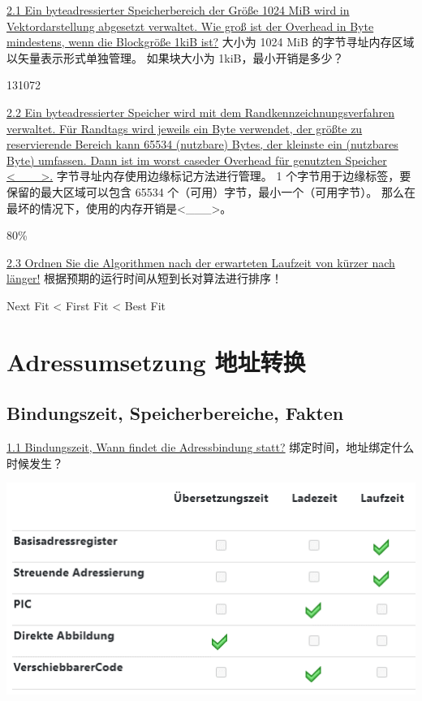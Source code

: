 \documentclass[fleqn]{article}
\begin{document}
\noindent\uline{2.1 Ein byteadressierter Speicherbereich der Größe 1024 MiB wird in Vektordarstellung abgesetzt verwaltet. Wie groß ist der Overhead in Byte mindestens, wenn die Blockgröße 1kiB ist?}
大小为 1024 MiB 的字节寻址内存区域以矢量表示形式单独管理。 如果块大小为 1kiB，最小开销是多少？

131072

\noindent\uline{2.2 Ein byteadressierter Speicher wird mit dem Randkennzeichnungsverfahren verwaltet. Für Randtags wird jeweils ein Byte verwendet, der größte zu reservierende Bereich kann 65534 (nutzbare) Bytes, der kleinste ein (nutzbares Byte) umfassen. Dann ist im worst caseder Overhead für genutzten Speicher <\_\_\_>.}
字节寻址内存使用边缘标记方法进行管理。 1 个字节用于边缘标签，要保留的最大区域可以包含 65534 个（可用）字节，最小一个（可用字节）。 那么在最坏的情况下，使用的内存开销是<\_\_\_>。

80\%


\noindent\uline{2.3 Ordnen Sie die Algorithmen nach der erwarteten Laufzeit von kürzer nach länger!}
根据预期的运行时间从短到长对算法进行排序！

Next Fit < First Fit < Best Fit




\section{Adressumsetzung 地址转换}

\subsection{Bindungszeit, Speicherbereiche, Fakten}

\noindent\uline{1.1	Bindungszeit, Wann findet die Adressbindung statt?}
绑定时间，地址绑定什么时候发生？

\begin{center}
    \includegraphics{22.png}
\end{center}
\end{document}
